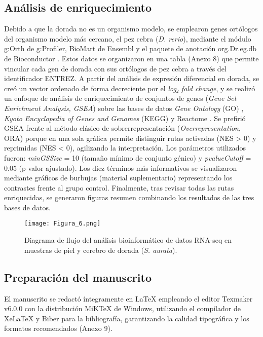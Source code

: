 \documentclass[10pt,a4paper]{article}
\begin{document}
\subsection{Análisis de enriquecimiento}  
Debido a que la dorada no es un organismo modelo, se emplearon genes ortólogos del organismo modelo más cercano, el pez cebra (\textit{D. rerio}), mediante el módulo g:Orth de g:Profiler, BioMart de Ensembl y el paquete de anotación org.Dr.eg.db de Bioconductor \parencite{Kolberg2023}. Estos datos se organizaron en una tabla (Anexo 8) que permite vincular cada gen de dorada con sus ortólogos de pez cebra a través del identificador ENTREZ. A partir del análisis de expresión diferencial en dorada, se creó un vector ordenado de forma decreciente por el \textit{log₂ fold change}, y se realizó un enfoque de análisis de enriquecimiento de conjuntos de genes (\textit{Gene Set Enrichment Analysis, GSEA}) sobre las bases de datos \textit{Gene Ontology} (GO) \parencite{GOConsortium2019}, \textit{Kyoto Encyclopedia of Genes and Genomes} (KEGG) \parencite{Kanehisa2017} y Reactome \parencite{Milacic2024}. Se prefirió GSEA frente al método clásico de sobrerrepresentación (\textit{Overrepresentation}, ORA) porque en una sola gráfica permite distinguir rutas activadas (NES > 0) y reprimidas (NES < 0), agilizando la interpretación. Los parámetros utilizados fueron: \textit{minGSSize} = 10 (tamaño mínimo de conjunto génico) y \textit{pvalueCutoff} = 0.05 (p-valor ajustado). Los diez términos más informativos se visualizaron mediante gráficos de burbujas (material suplementario) representando los contrastes frente al grupo control. Finalmente, tras revisar todas las rutas enriquecidas, se generaron figuras resumen combinando los resultados de las tres bases de datos.

\begin{figure}[ht]
  \centering
 \texttt{[image: Figura\_6.png]}

  \caption{Diagrama de flujo del análisis bioinformático de datos RNA-seq en muestras de piel y cerebro de dorada (\textit{S. aurata}).}
  \label{fig:6}
\end{figure}

\subsection{Preparación del manuscrito}
El manuscrito se redactó íntegramente en LaTeX empleando el editor Texmaker v6.0.0 con la distribución MiKTeX de Windows, utilizando el compilador de XeLaTeX y Biber para la bibliografía, garantizando la calidad tipográfica y los formatos recomendados (Anexo 9).
\end{document}
